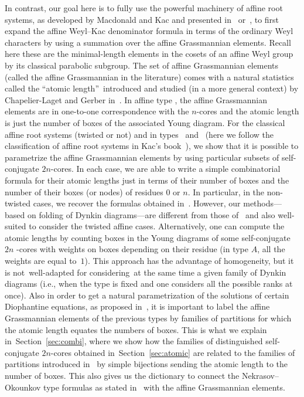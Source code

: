 \documentclass[pdftex]{sigma}
\numberwithin{equation}{section}
\begin{document}
In contrast, our goal here is to fully use the powerful machinery of
affine root systems, as developed by Macdonald and Kac and presented in~\cite{carter_affine,Mac}
or~\cite{KacB}, to first expand the affine Weyl--Kac denominator formula in
terms of the ordinary Weyl characters by using a summation over the
affine Grassmannian elements. Recall here these are the minimal-length
elements in the cosets of an affine Weyl group by its classical parabolic
subgroup. The set of affine Grassmannian elements (called the affine
Grassmannian in the literature) comes with a natural statistics called the
\textquotedblleft atomic length\textquotedblright\ introduced and studied
(in a more general context) by Chapelier-Laget and Gerber in~\cite{CGT}. In
affine type , the affine Grassmannian elements are in
one-to-one correspondence with the $n$-cores and the atomic length is just
the number of boxes of the associated Young diagram. For the classical
affine root systems (twisted or not) and in types~ and~
(here we follow the classification of affine root systems in
Kac's book~\cite{KacB}), we show that it is possible to parametrize the
affine Grassmannian elements by using particular subsets of self-conjugate $2n
$-cores. In each case, we are able to write a simple combinatorial formula
for their atomic lengths just in terms of their number of boxes and the
number of their boxes (or nodes) of residues $0$ or $n$. In particular, in
the non-twisted cases, we recover the formulas obtained in~\cite{STW}.
However, our methods---based on folding of Dynkin diagrams---are different from those of~\cite{STW} and also well-suited to
consider the twisted affine cases. Alternatively, one can compute the atomic
lengths by counting boxes in the Young diagrams of some self-conjugate $2n$%
-cores with weights on boxes depending on their residue (in type $A$, all
the weights are equal to~$1$). This approach has the advantage of
homogeneity, but it is not~well-adapted for considering~at the same time a
given family  of Dynkin diagrams (i.e., when the
type is fixed and one considers all the possible ranks at once). Also in
order to get a natural parametrization of the solutions of certain Diophantine
equations, as proposed in~\cite{BCT}, it is important to label the affine
Grassmannian elements of the previous types by families of partitions for
which the atomic length equates the numbers of boxes. This is what we
explain in~Section~\ref{sec:combi}, where we show how the families of distinguished
self-conjugate $2n$-cores obtained in~Section~\ref{sec:atomic} are related to the families
of partitions introduced in~\cite{Wmac} by simple bijections sending the atomic length to the number of boxes. This also gives us the dictionary to connect the Nekrasov--Okounkov type formulas as stated in~\cite{Wmac} with the affine Grassmannian elements.
\end{document}
